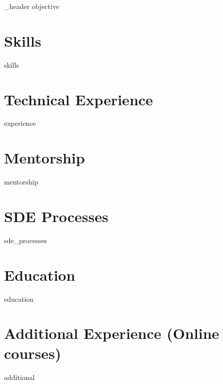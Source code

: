 \documentclass[letter,10pt]{article}
\author{Denis Kogutich} %
\begin{document}
{_header}
{objective}

\section{Skills}
{skills}

\section{Technical Experience}
{experience}

\section{Mentorship}
{mentorship}

\section{SDE Processes}
{sde_processes}

\section{Education}
{education}


\section{Additional Experience (Online courses)}
{additional}
\end{document}
